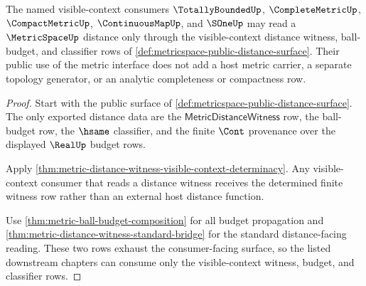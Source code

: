 \begin{theorem}
\label{thm:metricspace-visible-context-distance-consumer-surface}
The named visible-context consumers $\TotallyBoundedUp$, $\CompleteMetricUp$,
$\CompactMetricUp$, $\ContinuousMapUp$, and $\SOneUp$ may read a
$\MetricSpaceUp$ distance only through the visible-context distance witness,
ball-budget, and classifier rows of
\autoref{def:metricspace-public-distance-surface}. Their public use of the
metric interface does not add a host metric carrier, a separate topology
generator, or an analytic completeness or compactness row.
\end{theorem}
\begin{proof}
Start with the public surface of
\autoref{def:metricspace-public-distance-surface}. The only exported distance
data are the $\mathsf{MetricDistanceWitness}$ row, the ball-budget row, the
$\hsame$ classifier, and the finite $\Cont$ provenance over the displayed
$\RealUp$ budget rows.

Apply \autoref{thm:metric-distance-witness-visible-context-determinacy}. Any
visible-context consumer that reads a distance witness receives the determined
finite witness row rather than an external host distance function.

Use \autoref{thm:metric-ball-budget-composition} for all budget propagation and
\autoref{thm:metric-distance-witness-standard-bridge} for the standard
distance-facing reading. These two rows exhaust the consumer-facing surface, so
the listed downstream chapters can consume only the visible-context witness,
budget, and classifier rows.
\end{proof}

